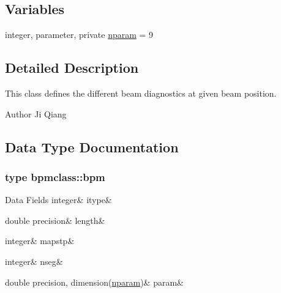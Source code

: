 \subsection*{Variables}
\begin{DoxyCompactItemize}
\item 
integer, parameter, private \mbox{\hyperlink{namespacebpmclass_ac2f2f373976236d08c9c68de895950eb}{nparam}} = 9
\end{DoxyCompactItemize}


\subsection{Detailed Description}
This class defines the different beam diagnostics at given beam position. 

\begin{DoxyAuthor}{Author}
Ji Qiang 
\end{DoxyAuthor}


\subsection{Data Type Documentation}
\label{structbpmclass_1_1bpm}
\subsubsection{type bpmclass\+::bpm}
\begin{DoxyFields}{Data Fields}
\mbox{\label{namespacebpmclass_a8759ea53c8b66bbdb08055405fff79a0}} 
integer&
itype&
\\
\hline

\mbox{\label{namespacebpmclass_a91bf471e42c1c733f27253fe367c02e1}} 
double precision&
length&
\\
\hline

\mbox{\label{namespacebpmclass_a57b5d567476a69c20de780f6fb8d0a2e}} 
integer&
mapstp&
\\
\hline

\mbox{\label{namespacebpmclass_af47828f23a39ecfbef81048d780c4107}} 
integer&
nseg&
\\
\hline

\mbox{\label{namespacebpmclass_ab4cbff356dd68d8a0563cb3b1d4ae235}} 
double precision, dimension(\mbox{\hyperlink{namespacebpmclass_ac2f2f373976236d08c9c68de895950eb}{nparam}})&
param&
\\
\hline

\end{DoxyFields}


